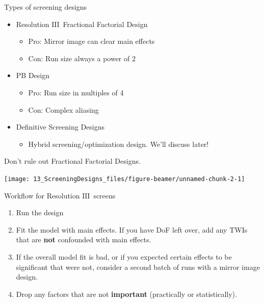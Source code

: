 \documentclass[
  10pt,
  ignorenonframetext,
]{beamer}
\providecommand{\tightlist}{%
  \setlength{\itemsep}{0pt}\setlength{\parskip}{0pt}}
\begin{document}
\begin{frame}{Types of screening designs}
\protect\hypertarget{types-of-screening-designs}{}
\begin{itemize}
\tightlist
\item
  Resolution \ensuremath{\mathrm{III}}~Fractional Factorial Design

  \begin{itemize}
  \tightlist
  \item
    Pro: Mirror image can clear main effects
  \item
    Con: Run size always a power of 2
  \end{itemize}
\end{itemize}

\pause

\begin{itemize}
\tightlist
\item
  PB Design

  \begin{itemize}
  \tightlist
  \item
    Pro: Run size in multiples of 4
  \item
    Con: Complex aliasing
  \end{itemize}
\end{itemize}

\pause

\begin{itemize}
\tightlist
\item
  Definitive Screening Designs

  \begin{itemize}
  \tightlist
  \item
    Hybrid screening/optimization design. We'll discuss later!
  \end{itemize}
\end{itemize}
\end{frame}

\begin{frame}{Don't rule out Fractional Factorial Designs.}
\protect\hypertarget{dont-rule-out-fractional-factorial-designs.}{}
\begin{center}\texttt{[image: 13\_ScreeningDesigns\_files/figure-beamer/unnamed-chunk-2-1]} \end{center}
\end{frame}

\begin{frame}{Workflow for Resolution \ensuremath{\mathrm{III}}~screens}
\protect\hypertarget{workflow-for-resolution-screens}{}
\begin{enumerate}
\tightlist
\item
  Run the design
\item
  Fit the model with main effects. If you have DoF left over, add any
  TWIs that are \textbf{not} confounded with main effects.
\item
  If the overall model fit is bad, or if you expected certain effects to
  be significant that were not, consider a second batch of runs with a
  mirror image design.
\item
  Drop any factors that are not \textbf{important} (practically or
  statistically).
\end{enumerate}
\end{frame}
\end{document}
